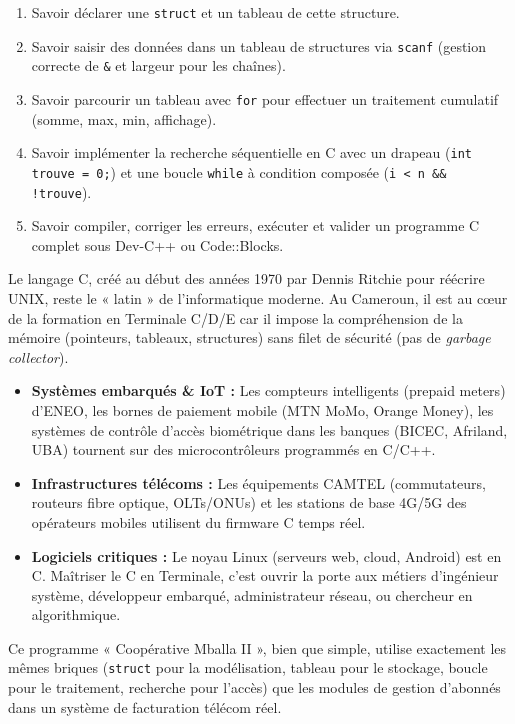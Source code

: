 \documentclass[11pt]{article}
\begin{document}
\begin{aretenir}
\begin{enumerate}
    \item Savoir déclarer une \texttt{struct} et un tableau de cette structure.
    \item Savoir saisir des données dans un tableau de structures via \texttt{scanf} (gestion correcte de \texttt{\&} et largeur pour les chaînes).
    \item Savoir parcourir un tableau avec \texttt{for} pour effectuer un traitement cumulatif (somme, max, min, affichage).
    \item Savoir implémenter la recherche séquentielle en C avec un drapeau (\texttt{int trouve = 0;}) et une boucle \texttt{while} à condition composée (\texttt{i < n \&\& !trouve}).
    \item Savoir compiler, corriger les erreurs, exécuter et valider un programme C complet sous Dev-C++ ou Code::Blocks.
\end{enumerate}
\end{aretenir}

\begin{savaistu}
Le langage C, créé au début des années 1970 par Dennis Ritchie pour réécrire UNIX, reste le « latin » de l'informatique moderne. Au Cameroun, il est au cœur de la formation en Terminale C/D/E car il impose la compréhension de la mémoire (pointeurs, tableaux, structures) sans filet de sécurité (pas de \emph{garbage collector}).
\begin{itemize}
    \item \textbf{Systèmes embarqués \& IoT :} Les compteurs intelligents (prepaid meters) d'ENEO, les bornes de paiement mobile (MTN MoMo, Orange Money), les systèmes de contrôle d'accès biométrique dans les banques (BICEC, Afriland, UBA) tournent sur des microcontrôleurs programmés en C/C++.
    \item \textbf{Infrastructures télécoms :} Les équipements CAMTEL (commutateurs, routeurs fibre optique, OLTs/ONUs) et les stations de base 4G/5G des opérateurs mobiles utilisent du firmware C temps réel.
    \item \textbf{Logiciels critiques :} Le noyau Linux (serveurs web, cloud, Android) est en C. Maîtriser le C en Terminale, c'est ouvrir la porte aux métiers d'ingénieur système, développeur embarqué, administrateur réseau, ou chercheur en algorithmique.
\end{itemize}
Ce programme « Coopérative Mballa II », bien que simple, utilise exactement les mêmes briques (\texttt{struct} pour la modélisation, tableau pour le stockage, boucle pour le traitement, recherche pour l'accès) que les modules de gestion d'abonnés dans un système de facturation télécom réel.
\end{savaistu}
\end{document}
